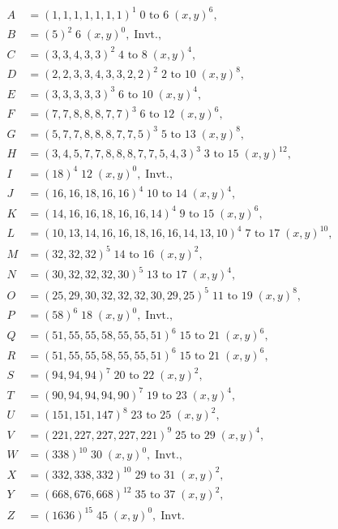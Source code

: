 \documentclass[11pt]{article}
\begin{document}
\begin{align*}
  A &= (1,1,1,1,1,1,1)^{1}\;\text{0 to 6}\;(x,y)^{6},\\
  B &= (5)^{2}\;6\;(x,y)^{0},\;\text{Invt.,}\\
  C &= (3,3,4,3,3)^{2}\;\text{4 to 8}\;(x,y)^{4},\\
  D &= (2,2,3,3,4,3,3,2,2)^{2}\;\text{2 to 10}\;(x,y)^{8},\\
  E &= (3,3,3,3,3)^{3}\;\text{6 to 10}\;(x,y)^{4},\\
  F &= (7,7,8,8,8,7,7)^{3}\;\text{6 to 12}\;(x,y)^{6},\\
  G &= (5,7,7,8,8,8,7,7,5)^{3}\;\text{5 to 13}\;(x,y)^{8},\\
  H &= (3,4,5,7,7,8,8,8,7,7,5,4,3)^{3}\;\text{3 to 15}\;(x,y)^{12},\\
  I &= (18)^{4}\;12\;(x,y)^{0},\;\text{Invt.,}\\
  J &= (16,16,18,16,16)^{4}\;\text{10 to 14}\;(x,y)^{4},\\
  K &= (14,16,16,18,16,16,14)^{4}\;\text{9 to 15}\;(x,y)^{6},\\
  L &= (10,13,14,16,16,18,16,16,14,13,10)^{4}\;\text{7 to 17}\;(x,y)^{10},\\
  M &= (32,32,32)^{5}\;\text{14 to 16}\;(x,y)^{2},\\
  N &= (30,32,32,32,30)^{5}\;\text{13 to 17}\;(x,y)^{4},\\
  O &= (25,29,30,32,32,32,30,29,25)^{5}\;\text{11 to 19}\;(x,y)^{8},\\
  P &= (58)^{6}\;18\;(x,y)^{0},\;\text{Invt.,}\\
  Q &= (51,55,55,58,55,55,51)^{6}\;\text{15 to 21}\;(x,y)^{6},\\
  R &= (51,55,55,58,55,55,51)^{6}\;\text{15 to 21}\;(x,y)^{6},\\
  S &= (94,94,94)^{7}\;\text{20 to 22}\;(x,y)^{2},\\
  T &= (90,94,94,94,90)^{7}\;\text{19 to 23}\;(x,y)^{4},\\
  U &= (151,151,147)^{8}\;\text{23 to 25}\;(x,y)^{2},\\
  V &= (221,227,227,227,221)^{9}\;\text{25 to 29}\;(x,y)^{4},\\
  W &= (338)^{10}\;30\;(x,y)^{0},\;\text{Invt.,}\\
  X &= (332,338,332)^{10}\;\text{29 to 31}\;(x,y)^{2},\\
  Y &= (668,676,668)^{12}\;\text{35 to 37}\;(x,y)^{2},\\
  Z &= (1636)^{15}\;45\;(x,y)^{0},\;\text{Invt.}
\end{align*}
\end{document}
